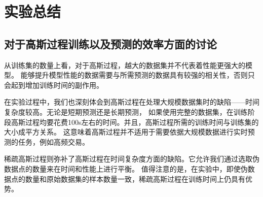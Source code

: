 \section{实验总结}

\subsection{对于高斯过程训练以及预测的效率方面的讨论}

从训练集的数量上看，对于高斯过程，越大的数据集并不代表着性能更强大的模型。
能够提升模型性能的数据需要与所需预测的数据具有较强的相关性，否则只会起到增加训练时间的副作用。

在实验过程中，我们也深刻体会到高斯过程在处理大规模数据集时的缺陷——时间复杂度较高。无论是短期预测还是长期预测，
如果使用完整的数据集，在训练阶段高斯过程均要花费100s左右的时间。并且，高斯过程所需的训练时间与训练集的大小成平方关系。
这意味着高斯过程并不适用于需要依据大规模数据进行实时预测的任务，例如高频交易。

稀疏高斯过程则弥补了高斯过程在时间复杂度方面的缺陷。它允许我们通过选取伪数据点的数量来在时间和性能上进行平衡。
值得注意的是，在实验中，即使伪数据点的数量和原始数据集的样本数量一致，稀疏高斯过程在训练时间上仍具有优势。